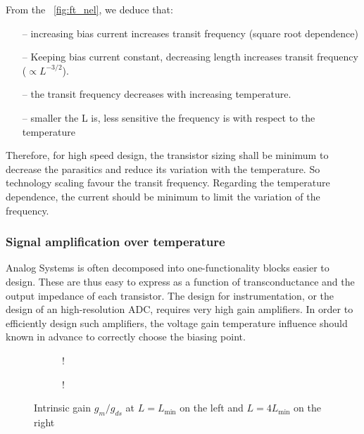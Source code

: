 From the \figurename~\ref{fig:ft_nel}, we deduce that:
\begin{itemize}
\item[--] increasing bias current increases transit frequency (square root dependence)
\item[--] Keeping bias current constant, decreasing length increases transit frequency (\(\propto L^{-3/2}\)).
\item[--] the transit frequency decreases with increasing temperature.
\item[--] smaller the L is, less sensitive the frequency is with respect to the temperature
\end{itemize}
Therefore, for high speed design, the transistor sizing shall be minimum to decrease the parasitics and reduce its variation with the temperature. So technology scaling favour the transit frequency. Regarding the temperature dependence, the current should be minimum to limit the variation of the frequency.

\subsubsection{Signal amplification over temperature}
\label{sec:des_accuracy}
Analog Systems is often decomposed into one-functionality blocks easier to design. These are thus easy to express as a function of transconductance and the output impedance of each transistor. The design for instrumentation, or the design of an high-resolution ADC, requires very high gain amplifiers. In order to efficiently design such amplifiers, the voltage gain temperature influence should known in advance to correctly choose the biasing point.

\begin{figure}[!ht]
    \centering
    \begin{subfigure}[b]{0.48\textwidth}
        \resizebox {\textwidth} {!} { 
            
        }
    \end{subfigure}
    \begin{subfigure}[b]{0.48\textwidth}
        \resizebox {\textwidth} {!} { 
            
        }
        \label{fig:Av_nel_sensitivity}
    \end{subfigure}
    \caption{Intrinsic gain \(g_m/g_{ds} \) at \(L = L_{\min}\) on the left and \(L = 4 L_{\min}\) on the right}
    \label{fig:Av_nel}
\end{figure}

